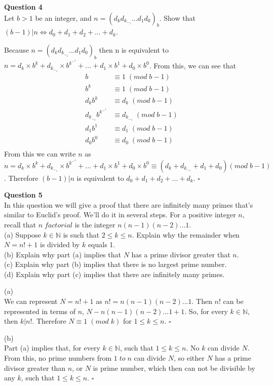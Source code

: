 \documentclass{article}
\begin{document}
\bigskip
{\bf Question 4}\\
Let $b>1$ be an integer, and $n=(d_k d_k_-_1...d_1d_0)_b$. Show that $(b-1)|n \Leftrightarrow d_0+d_1+d_2+...+d_k$.

\smallskip
Because $n=(d_k d_k_-_1...d_1d_0)_b$ then n is equivalent to $n=d_k \times b^k+d_k_-_1 \times b^k^-^1+...+d_1 \times b^1+d_0 \times b^0$. From this, we can see that
\begin{equation*}
\begin{split}
    b & \equiv 1\;(mod\;b-1)\\
    b^k & \equiv 1\;(mod\;b-1)\\
    d_k b^k & \equiv d_k\;(mod\;b-1)\\
    d_k_-_1 b^k^-^1 & \equiv d_k_-_1\;(mod\;b-1)\\
    d_1 b^1 & \equiv d_1\;(mod\;b-1)\\
    d_0 b^0 & \equiv d_0\;(mod\;b-1)\\
\end{split}
\end{equation*}
From this we can write $n$ as $n=d_k \times b^k+d_k_-_1 \times b^k^-^1+...+d_1 \times b^1+d_0 \times b^0 \equiv (d_k+d_k_-_1+d_1+d_0)(mod\;b-1)$. Therefore $(b-1)|n$ is equivalent to $d_0+d_1+d_2+...+d_k$. $\square$

\newpage

{\bf Question 5}\\
In this question we will give a proof that there are infinitely many primes that's similar to Euclid's proof. We'll do it in several steps. For a positive integer $n$, recall that $n \; factorial$ is the integer $n(n-1)(n-2)...1$.\\
(a) Suppose $k \in \mathbb{N}$ is such that $2 \leq k \leq n$. Explain why the remainder when $N=n!+1$ is divided by $k$ equals 1.\\
(b) Explain why part (a) implies that $N$ has a prime divisor greater that $n$.\\
(c) Explain why part (b) implies that there is no largest prime number.\\
(d) Explain why part (c) implies that there are infinitely many primes.

\smallskip
(a)\\
We can represent $N=n!+1$ as $n!=n(n-1)(n-2)...1$. Then $n!$ can be represented in terms of $n$, $N-n(n-1)(n-2)...1+1$. So, for every $k \in \mathbb{N}$, then $k|n!$. Therefore $N \equiv 1\;(mod\;k)$ for $1 \leq k \leq n$. $\square$

\smallskip
(b)\\
Part (a) implies that, for every $k \in \mathbb{N}$, such that $1 \leq k \leq n$. No $k$ can divide $N$. From this, no prime numbers from $1 \; to \; n$ can divide $N$, so either $N$ has a prime divisor greater than $n$, or $N$ is prime number, which then can not be divisible by any $k$, such that $1 \leq k \leq n$. $\square$
\end{document}
